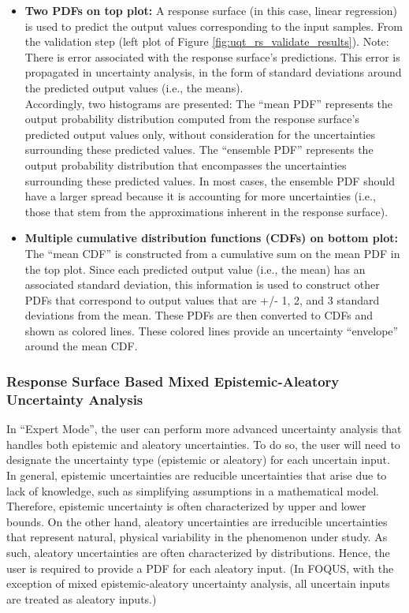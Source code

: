 \begin{itemize}
\item{{\bf Two PDFs on top plot:} A response surface (in this case, linear regression) is used to predict the output values corresponding to the input samples. From the validation step (left plot of Figure \ref{fig:uqt_rs_validate_results}). Note: There is error associated with the response surface’s predictions. This error is propagated in uncertainty analysis, in the form of standard deviations around the predicted output values (i.e., the means). \\
	
	Accordingly, two histograms are presented: The ``mean PDF'' represents the output probability distribution computed from the response surface's predicted output values only, without consideration for the uncertainties surrounding these predicted values. The ``ensemble PDF'' represents the output probability distribution that encompasses the uncertainties surrounding these predicted values. In most cases, the ensemble PDF should have a larger spread because it is accounting for more uncertainties (i.e., those that stem from the approximations inherent in the response surface).}
\item{{\bf Multiple cumulative distribution functions (CDFs) on bottom plot:} The ``mean CDF'' is constructed from a cumulative sum on the mean PDF in the top plot. Since each predicted output value (i.e., the mean) has an associated standard deviation, this information is used to construct other PDFs that correspond to output values that are +/- 1, 2, and 3 standard deviations from the mean. These PDFs are then converted to CDFs and shown as colored lines. These colored lines provide an uncertainty ``envelope'' around the mean CDF.}
\end{itemize}

\subsubsection{Response Surface Based Mixed Epistemic-Aleatory Uncertainty Analysis}

In ``Expert Mode'', the user can perform more advanced uncertainty analysis
that handles both epistemic and aleatory uncertainties.
To do so, the user will need to designate the uncertainty type (epistemic or
aleatory) for each uncertain input. In general, epistemic uncertainties are
reducible uncertainties that arise due to lack of knowledge, such as
simplifying assumptions in a mathematical model. Therefore, epistemic
uncertainty is
often characterized by upper and lower bounds. On the other hand, aleatory
uncertainties are irreducible uncertainties that represent natural,
physical variability in the phenomenon under study. As such, aleatory
uncertainties are often characterized by distributions. Hence, the user is
required to provide a PDF for each aleatory input.
(In FOQUS, with the exception of mixed epistemic-aleatory uncertainty
analysis, all uncertain inputs are treated as aleatory inputs.)

